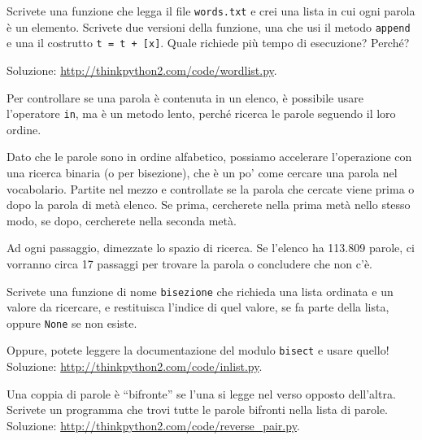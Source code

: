 \documentclass[10pt]{book}
\begin{document}
\vspace{0.2in}
\begin{exercise}

Scrivete una funzione che legga il file {\tt words.txt} e crei una lista in cui ogni parola è un elemento. Scrivete due versioni della funzione, una che usi il metodo {\tt append} e una il costrutto {\tt t = t + [x]}. Quale richiede più tempo di esecuzione? Perché?

Soluzione: \url{http://thinkpython2.com/code/wordlist.py}.

\end{exercise}

\vspace{0.2in}
\begin{exercise}
\label{wordlist1}
\label{bisection}

Per controllare se una parola è contenuta in un elenco, è possibile usare l'operatore {\tt in}, ma è un metodo lento, perché ricerca le parole seguendo il loro ordine.

Dato che le parole sono in ordine alfabetico, possiamo accelerare l'operazione con una ricerca binaria (o per bisezione), che è un po' come cercare una parola nel vocabolario.
Partite nel mezzo e controllate se la parola che cercate viene prima o dopo la parola di metà elenco. Se prima, cercherete nella prima metà nello stesso modo, se dopo, cercherete nella seconda metà.

Ad ogni passaggio, dimezzate lo spazio di ricerca. Se l'elenco ha 113.809 parole, ci vorranno circa 17 passaggi per trovare la parola o concludere che non c'è.

Scrivete una funzione di nome {\tt bisezione} che richieda una lista ordinata e un valore da ricercare, e restituisca l'indice di quel valore, se fa parte della lista, oppure {\tt None} se non esiste.

Oppure, potete leggere la documentazione del modulo {\tt bisect} e usare quello!  Soluzione: \url{http://thinkpython2.com/code/inlist.py}.

\end{exercise}

\vspace{0.2in}
\begin{exercise}

Una coppia di parole è ``bifronte'' se l'una si legge nel verso opposto dell'altra. Scrivete un programma che trovi tutte le parole bifronti nella lista di parole.  Soluzione: \url{http://thinkpython2.com/code/reverse_pair.py}.

\end{exercise}
\end{document}
